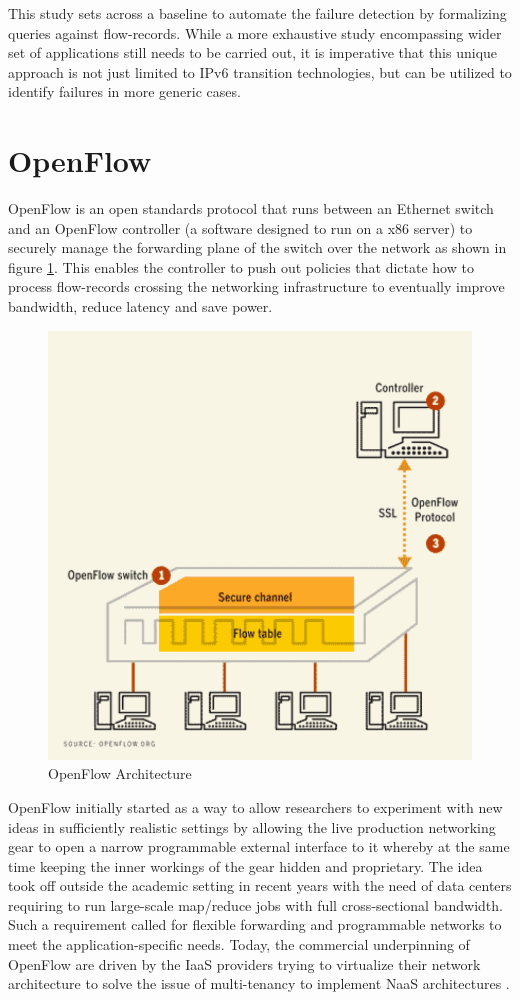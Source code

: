 This study sets across a baseline to automate the failure detection by formalizing queries against flow-records. While a more exhaustive study encompassing wider set of applications still needs to be carried out, it is imperative that this unique approach is not just limited to IPv$6$ transition technologies, but can be utilized to identify failures in more generic cases.

\section{OpenFlow}\label{sec:openflow}
OpenFlow \cite{nmckeown:2008} is an open standards protocol that runs between an Ethernet switch and an OpenFlow controller (a software designed to run on a x$86$ server) to securely manage the forwarding plane of the switch over the network as shown in figure \ref{fig:openflow-architecture}. This enables the controller to push out policies that dictate how to process flow-records crossing the networking infrastructure to eventually improve bandwidth, reduce latency and save power. 
\begin{figure}[h!]
\begin{center}
  \includegraphics* [width=0.5\linewidth]{figures/openflow}	
  \caption{OpenFlow Architecture \cite{newscientist:2009}}
  \label{fig:openflow-architecture}
\end{center}
\end{figure}

OpenFlow initially started as a way to allow researchers to experiment with new ideas in sufficiently realistic settings by allowing the live production networking gear to open a narrow programmable external interface to it whereby at the same time keeping the inner workings of the gear hidden and proprietary.  The idea took off outside the  academic setting in recent years with the need of data centers requiring to run large-scale map/reduce jobs with full cross-sectional bandwidth. Such a requirement called for flexible forwarding and programmable networks to meet the application-specific needs. Today, the commercial underpinning of OpenFlow are driven by the \ac{IaaS} providers trying to virtualize their network architecture to solve the issue of multi-tenancy to implement \ac{NaaS} architectures \cite{tbenson:2011}.

